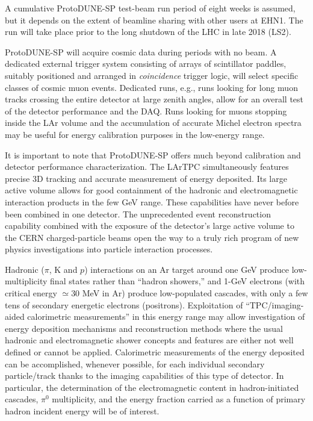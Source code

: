 A cumulative ProtoDUNE-SP test-beam run period of eight weeks is assumed, but it depends on the extent of beamline sharing with other users at EHN1. The run will take place prior to the long shutdown of the LHC in late 2018 (LS2). 

ProtoDUNE-SP will acquire cosmic data during periods with no beam. A dedicated external trigger system consisting of arrays of scintillator paddles, suitably positioned and arranged in \textit{coincidence} trigger logic, 
will select specific classes of cosmic muon events. Dedicated runs, e.g., runs looking for long muon tracks crossing the entire detector at large zenith angles, allow for an overall test of the detector performance and the DAQ. Runs looking for muons stopping inside the LAr volume and the accumulation of accurate Michel electron spectra may be useful for energy calibration purposes in the low-energy range.


It is important to note that ProtoDUNE-SP offers much beyond calibration  and detector performance characterization.  The LArTPC simultaneously features precise 3D tracking and accurate measurement of energy deposited. Its large active volume allows for good containment of the hadronic and electromagnetic interaction products in the few GeV range. These capabilities have never before been combined in one detector.  The unprecedented event reconstruction capability combined with the exposure of the detector's large active volume to the CERN charged-particle beams open the way to a truly rich program of new physics investigations into particle interaction processes. 


 Hadronic ($\pi$, K and $p$) interactions on an Ar target around one GeV produce low-multiplicity final states rather than ``hadron showers,'' 
 and 1-GeV electrons  (with critical energy $\simeq 30$ MeV in Ar) produce low-populated cascades, with only a few tens of secondary energetic electrons (positrons). 
Exploitation of ``TPC/imaging-aided calorimetric measurements'' in this energy range may allow investigation of 
energy deposition mechanisms and reconstruction methods where the usual hadronic and electromagnetic shower concepts and features are either not well defined or cannot be applied.
Calorimetric measurements of the energy deposited can be accomplished,  whenever possible, for each individual secondary particle/track thanks to the imaging capabilities of this type of detector.
In particular, the determination of the electromagnetic  content in hadron-initiated cascades, $\pi^0$ multiplicity, and the energy fraction carried as a function of primary hadron incident energy will be of interest.

